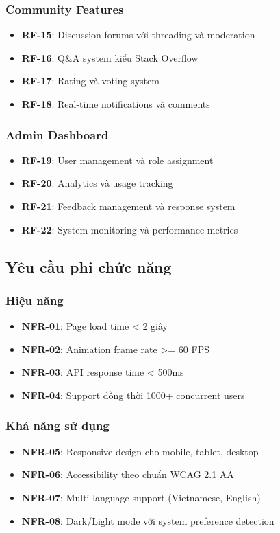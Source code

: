 \documentclass[12pt,a4paper]{article}
\begin{document}
\subsubsection{Community Features}
\begin{itemize}
    \item \textbf{RF-15}: Discussion forums với threading và moderation
    \item \textbf{RF-16}: Q\&A system kiểu Stack Overflow
    \item \textbf{RF-17}: Rating và voting system
    \item \textbf{RF-18}: Real-time notifications và comments
\end{itemize}

\subsubsection{Admin Dashboard}
\begin{itemize}
    \item \textbf{RF-19}: User management và role assignment
    \item \textbf{RF-20}: Analytics và usage tracking
    \item \textbf{RF-21}: Feedback management và response system
    \item \textbf{RF-22}: System monitoring và performance metrics
\end{itemize}

\subsection{Yêu cầu phi chức năng}

\subsubsection{Hiệu năng}
\begin{itemize}
    \item \textbf{NFR-01}: Page load time < 2 giây
    \item \textbf{NFR-02}: Animation frame rate >= 60 FPS
    \item \textbf{NFR-03}: API response time < 500ms
    \item \textbf{NFR-04}: Support đồng thời 1000+ concurrent users
\end{itemize}

\subsubsection{Khả năng sử dụng}
\begin{itemize}
    \item \textbf{NFR-05}: Responsive design cho mobile, tablet, desktop
    \item \textbf{NFR-06}: Accessibility theo chuẩn WCAG 2.1 AA
    \item \textbf{NFR-07}: Multi-language support (Vietnamese, English)
    \item \textbf{NFR-08}: Dark/Light mode với system preference detection
\end{itemize}
\end{document}

